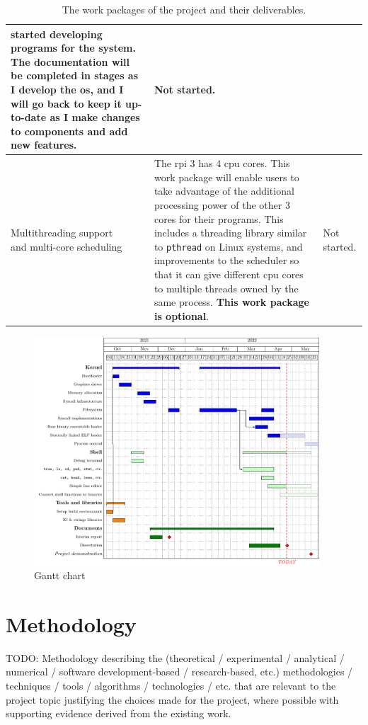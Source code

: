 \documentclass{article}
\begin{document}
\begin{table}[tbp]
\begin{center}
\begin{tabularx}{\textwidth}{|p{}|X|p{}|}
    started developing programs for the system. The documentation will be
    completed in stages as I develop the \gls{os}, and I will go back
    to keep it up-to-date as I make changes to components and add new
    features. &
    Not started.
    \\ \hline
    \makecell[lt]{Multithreading support \\ and multi-core scheduling} &
    The \gls{rpi} 3 has 4 \gls{cpu} cores. This work package will enable users
    to take advantage of the additional processing power of the other 3 cores
    for their programs. This includes a threading library similar to
    \texttt{pthread} on Linux systems, and improvements to the scheduler so
    that it can give different \gls{cpu} cores to multiple threads owned by the
    same process. \textbf{This work package is optional}. &
    Not started.
    \\ \hline
\end{tabularx}
\caption{The work packages of the project and their deliverables.}
\label{tab:work-packages}
\end{center}
\end{table}

\begin{figure}[htbp]
    \includegraphics[width=0.95\textwidth]{build/gantt.pdf}
    \caption{Gantt chart}
    \label{fig:gantt-chart}
\end{figure}


\section{Methodology}
TODO: Methodology describing the (theoretical / experimental / analytical /
numerical / software development-based / research-based, etc.) methodologies /
techniques / tools / algorithms / technologies / etc. that are relevant to the
project topic justifying the choices made for the project, where possible with
supporting evidence derived from the existing work.
\end{document}
